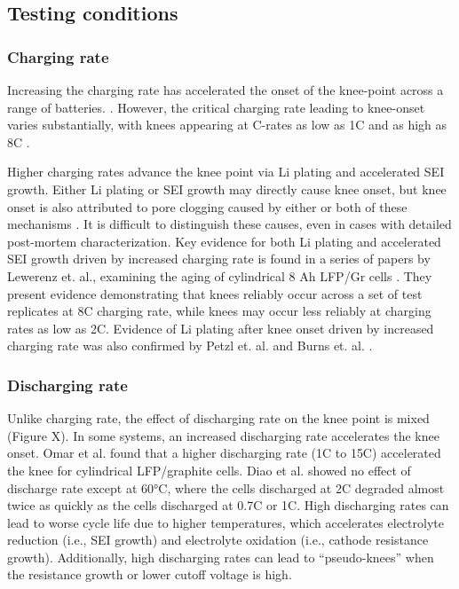 \documentclass[journal=jpcl, manuscript=article, layout=onecolumn]{achemso}
\begin{document}
\subsection{Testing conditions}

\subsubsection{Charging rate}
Increasing the charging rate has accelerated the onset of the knee-point across a range of batteries. \cite{lewerenz_systematic_2017,lewerenz_post-mortem_2017, petzl_lithium_2015, burns_-situ_2015, waldmann_optimization_2015, schuster_nonlinear_2015, severson_data-driven_2019, schindler_fast_2018, keil_linear_2019}. However, the critical charging rate leading to knee-onset varies substantially, with knees appearing at C-rates as low as 1C \cite{waldmann_optimization_2015} and as high as 8C \cite{lewerenz_systematic_2017}. 

Higher charging rates advance the knee point via Li plating and accelerated SEI growth. Either Li plating or SEI growth may directly cause knee onset, but knee onset is also attributed to pore clogging caused by either or both of these mechanisms \cite{yang_modeling_2017}. It is difficult to distinguish these causes, even in cases with detailed post-mortem characterization. Key evidence for both Li plating and accelerated SEI growth driven by increased charging rate is found in a series of papers by Lewerenz et. al., examining the aging of cylindrical 8 Ah LFP/Gr cells \cite{lewerenz_systematic_2017,lewerenz_post-mortem_2017}. They present evidence demonstrating that knees reliably occur across a set of test replicates at 8C charging rate, while knees may occur less reliably at charging rates as low as 2C. Evidence of Li plating after knee onset driven by increased charging rate was also confirmed by Petzl et. al. \cite{petzl_lithium_2015} and Burns et. al. \cite{burns_-situ_2015}. 



\subsubsection{Discharging rate}

Unlike charging rate, the effect of discharging rate on the knee point is mixed (Figure X).
In some systems, an increased discharging rate
accelerates the knee onset.
Omar et al.\cite{omar_lithium_2014} found that a higher discharging rate (1C to 15C) accelerated the knee for cylindrical LFP/graphite cells.
Diao et al.\cite{diao_accelerated_2019} showed no effect of discharge rate except at 60°C, where the cells discharged at 2C degraded almost twice as quickly as the cells discharged at 0.7C or 1C.
High discharging rates can lead to worse cycle life due to higher temperatures, which accelerates electrolyte reduction (i.e., SEI growth) and electrolyte oxidation (i.e., cathode resistance growth). Additionally, high discharging rates can lead to ``pseudo-knees'' when the resistance growth or lower cutoff voltage is high.
\end{document}

